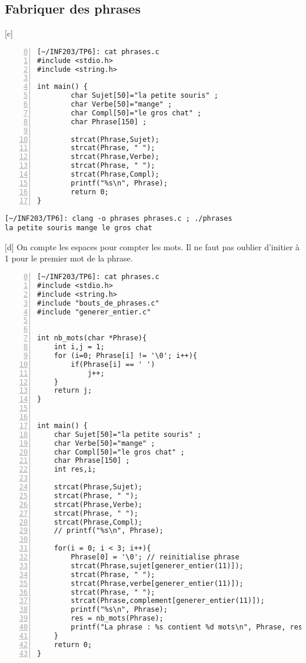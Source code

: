 \documentclass[12pt,a4paper,notitlepage,colorinlistoftodos]{article}
\begin{document}
\subsection*{Fabriquer des phrases}

[c] 
\begin{lstlisting}[numbers=left, firstnumber = 0 ]
[~/INF203/TP6]: cat phrases.c
#include <stdio.h>
#include <string.h>

int main() {
        char Sujet[50]="la petite souris" ;
        char Verbe[50]="mange" ;
        char Compl[50]="le gros chat" ;
        char Phrase[150] ;

        strcat(Phrase,Sujet);
        strcat(Phrase, " ");
        strcat(Phrase,Verbe);
        strcat(Phrase, " ");
        strcat(Phrase,Compl);
        printf("%s\n", Phrase);
        return 0;
}
\end{lstlisting}

\begin{lstlisting}
[~/INF203/TP6]: clang -o phrases phrases.c ; ./phrases
la petite souris mange le gros chat
\end{lstlisting}

[d]
On compte les espaces pour compter les mots. Il ne faut pas oublier d'initier à 1 pour le premier mot de la phrase.

\begin{lstlisting}[numbers=left, firstnumber = 0 ]
[~/INF203/TP6]: cat phrases.c
#include <stdio.h>
#include <string.h>
#include "bouts_de_phrases.c"
#include "generer_entier.c"


int nb_mots(char *Phrase){
	int i,j = 1;
	for (i=0; Phrase[i] != '\0'; i++){
		if(Phrase[i] == ' ')
			j++;
	}
	return j;
}


int main() {
	char Sujet[50]="la petite souris" ;
	char Verbe[50]="mange" ;
	char Compl[50]="le gros chat" ;
	char Phrase[150] ;
	int res,i;

	strcat(Phrase,Sujet);
	strcat(Phrase, " ");
	strcat(Phrase,Verbe);
	strcat(Phrase, " ");
	strcat(Phrase,Compl);
	// printf("%s\n", Phrase);

	for(i = 0; i < 3; i++){
		Phrase[0] = '\0'; // reinitialise phrase
		strcat(Phrase,sujet[generer_entier(11)]);
		strcat(Phrase, " ");
		strcat(Phrase,verbe[generer_entier(11)]);
		strcat(Phrase, " ");
		strcat(Phrase,complement[generer_entier(11)]);
		printf("%s\n", Phrase);
		res = nb_mots(Phrase);
		printf("La phrase : %s contient %d mots\n", Phrase, res);
	}
	return 0;
}
\end{lstlisting}
\end{document}
